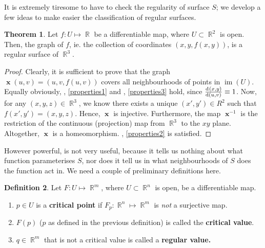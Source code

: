\documentclass{amsart} %
\theoremstyle{mytheoremstyle}
\theoremstyle{definition}
\newtheorem{definition}{Definition}[section]
\newtheorem{theorem}[definition]{Theorem}
\numberwithin{equation}{section}
\DeclareMathOperator{\R}{\mathbb{R}}
\DeclareMathOperator{\1}{\mathbbm{1}}
\DeclareMathOperator{\im}{im}
\DeclareMathOperator{\x}{\mathbf{x}}
\begin{document}
It is extremely tiresome to have to check the regularity of surface $S$; we develop a few ideas to make easier the classification of regular surfaces.


\begin{theorem}
	\label{thmgraphofdifferentiablefunctionsetisregular}
	Let $f : U \mapsto \R$ be a differentiable map, where $U \subset \R^2$ is open. Then, the graph of $f$, ie. the collection of coordinates $(x,y,f(x,y))$, is a regular surface of $\R^3$.
\end{theorem}

\begin{proof}
	Clearly, it is sufficient to prove that the graph $\x(u,v) = (u,v,f(u,v))$ covers all neighbourhoods of points in $\im(U)$. Equally obviously, , \eqref{properties1} and , \eqref{properties3} hold, since $\od{(x,y)}{(u,v)} \equiv 1$. Now, for any $(x,y,z) \in \R^3$, we know there exists a unique $(x',y') \in R^2$ such that $f(x',y') = (x,y,z)$. Hence, $\x$ is injective. Furthermore, the map $\x^{-1}$ is the restriction of the continuous (projection) map from $\R^3 $ to the $xy$ plane. Altogether, $\x $ is a homeomorphism. , \eqref{properties2} is satisfied.
\end{proof}


However powerful,  is not very useful, because it tells us nothing about what function parameterises $S$, nor does it tell us in what neighbourhoods of $S$ does the function act in. We need a couple of preliminary definitions here.

\begin{definition}
	\label{defcriticalpointsvaluesregularvalues}
	Let $F: U \mapsto \R^m$, where $U \subset \R^n$ is open, be a differentiable map.
	
	\begin{enumerate}
		\item $p \in U$ is a \textbf{critical point} if $F_p : \R^n \mapsto \R^m$ is \textit{not} a surjective map.
		
		\item $F(p)$ ($p$ as defined in the previous definition) is called the \textbf{critical value}.
		
		
		\item $q \in \R^m$ that is not a critical value is called a \textbf{regular value.}
	\end{enumerate}
\end{definition}
\end{document}
